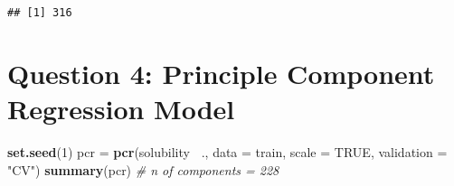 \documentclass[
]{article}
\newenvironment{Shaded}{\begin{snugshade}}{\end{snugshade}}
\newcommand{\CommentTok}[1]{\textcolor[rgb]{0.56,0.35,0.01}{\textit{#1}}}
\newcommand{\DataTypeTok}[1]{\textcolor[rgb]{0.13,0.29,0.53}{#1}}
\newcommand{\DecValTok}[1]{\textcolor[rgb]{0.00,0.00,0.81}{#1}}
\newcommand{\KeywordTok}[1]{\textcolor[rgb]{0.13,0.29,0.53}{\textbf{#1}}}
\newcommand{\NormalTok}[1]{#1}
\newcommand{\OperatorTok}[1]{\textcolor[rgb]{0.81,0.36,0.00}{\textbf{#1}}}
\newcommand{\OtherTok}[1]{\textcolor[rgb]{0.56,0.35,0.01}{#1}}
\newcommand{\StringTok}[1]{\textcolor[rgb]{0.31,0.60,0.02}{#1}}
\begin{document}
\begin{verbatim}
## [1] 316
\end{verbatim}

\hypertarget{question-4-principle-component-regression-model}{%
\section{Question 4: Principle Component Regression
Model}\label{question-4-principle-component-regression-model}}

\begin{Shaded}
\begin{Highlighting}[]
\KeywordTok{set.seed}\NormalTok{(}\DecValTok{1}\NormalTok{)}
\NormalTok{pcr =}\StringTok{ }\KeywordTok{pcr}\NormalTok{(solubility }\OperatorTok{~}\NormalTok{., }\DataTypeTok{data =}\NormalTok{ train, }\DataTypeTok{scale =} \OtherTok{TRUE}\NormalTok{, }\DataTypeTok{validation =} \StringTok{"CV"}\NormalTok{)}
\KeywordTok{summary}\NormalTok{(pcr) }\CommentTok{# n of components = 228}
\end{Highlighting}
\end{Shaded}
\end{document}
